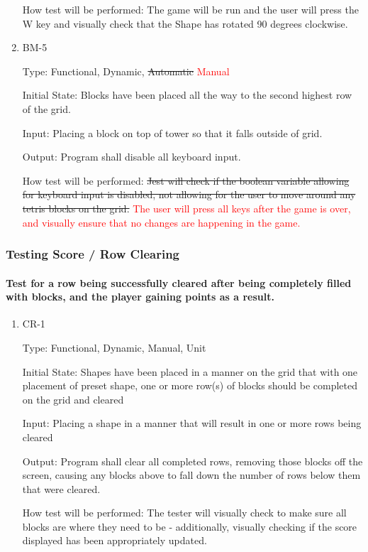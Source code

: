 \documentclass[12pt, titlepage]{article}
\begin{document}
\begin{enumerate}
How test will be performed: The game will be run and the user will press the W key and visually check that the Shape has rotated 90 degrees clockwise. 

\item{BM-5\\}

Type: Functional, Dynamic, \sout{Automatic} \textcolor{red}{Manual}
					
Initial State: Blocks have been placed all the way to the second highest row of the grid.
					
Input: Placing a block on top of tower so that it falls outside of grid.
					
Output: Program shall disable all keyboard input.
					
How test will be performed: \sout{Jest will check if the boolean variable allowing for keyboard input is disabled, not allowing for the user to move around any tetris blocks on the grid.} \textcolor{red}{The user will press all keys after the game is over, and visually ensure that no changes are happening in the game.}

\end{enumerate}

\subsubsection{Testing Score / Row Clearing}
\paragraph{Test for a row being successfully cleared after being completely filled with blocks, and the player gaining points as a result.}

\begin{enumerate}

\item{CR-1\\}

Type: Functional, Dynamic, Manual, Unit
					
Initial State: Shapes have been placed in a manner on the grid that with one placement of preset shape, one or more row(s) of blocks should be completed on the grid and cleared
					
Input: Placing a shape in a manner that will result in one or more rows being cleared
					
Output: Program shall clear all completed rows, removing those blocks off the screen, causing any blocks above to fall down the number of rows below them that were cleared.
					
How test will be performed: The tester will visually check to make sure all blocks are where they need to be - additionally, visually checking if the score displayed has been appropriately updated.

\end{enumerate}
\end{document}
